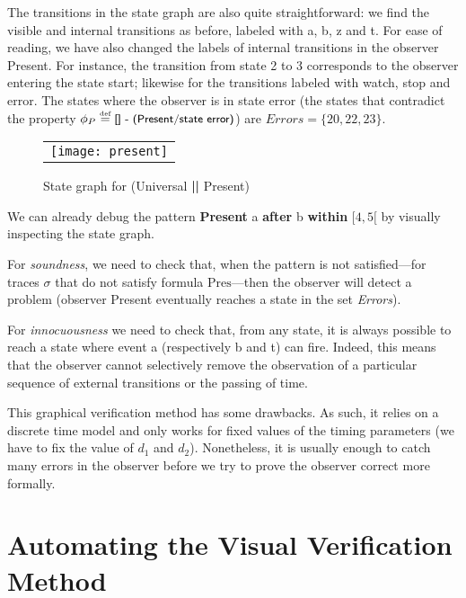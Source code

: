 \documentclass[a4paper]{scrartcl}
\def\code#1{\textsf{\small\bfseries #1}}
\def\vars#1{\textsf{\small #1}}
\let\s\sigma
\newcommand{\eqdef}{\ensuremath{\overset{\text{\tiny def}}{=}}}
\begin{document}
The transitions in the state graph are also quite straightforward: we
find the visible and internal transitions as before, labeled with
\vars{a}, \vars{b}, \vars{z} and \vars{t}. For ease of reading, we
have also changed the labels of internal transitions in the observer
\vars{Present}. For instance, the transition from state 2 to 3
corresponds to the observer entering the state \vars{start}; likewise
for the transitions labeled with \vars{watch}, \vars{stop} and
\vars{error}. The states where the observer is in state \vars{error}
(the states that contradict the property $\phi_P \eqdef \vars{[] -
  (Present/state error)}$) are $\mathit{Errors} = \{20, 22, 23\}$.

\begin{figure}[ht]
\centering
\begin{tabular}[c]{l}
\texttt{[image: present]}\\
\end{tabular}
\caption{State graph for (\vars{Universal} \code{||} \vars{Present})}
\label{fig:example}
\end{figure}

We can already debug the pattern \code{Present} \vars{a} \code{after}
\vars{b} \code{within} $[4,5[$ by visually inspecting the state
graph.

For \emph{soundness}, we need to check that, when the pattern is not
satisfied---for traces $\s$ that do not satisfy formula
$\mathrm{Pres}$---then the observer will detect a problem (observer
\vars{Present} eventually reaches a state in the set \emph{Errors}).

For \emph{innocuousness} we need to check that, from any state, it is
always possible to reach a state where event \vars{a} (respectively
\vars{b} and \vars{t}) can fire. Indeed, this means that the observer
cannot selectively remove the observation of a particular sequence of
external transitions or the passing of time. 

This graphical verification method has some drawbacks. As such, it
relies on a discrete time model and only works for fixed values of the
timing parameters (we have to fix the value of $d_1$ and
$d_2$). Nonetheless, it is usually enough to catch many errors in the
observer before we try to prove the observer correct more formally.

\section{Automating  the Visual Verification Method}
\label{sec:autom-visu-verif}
\end{document}

